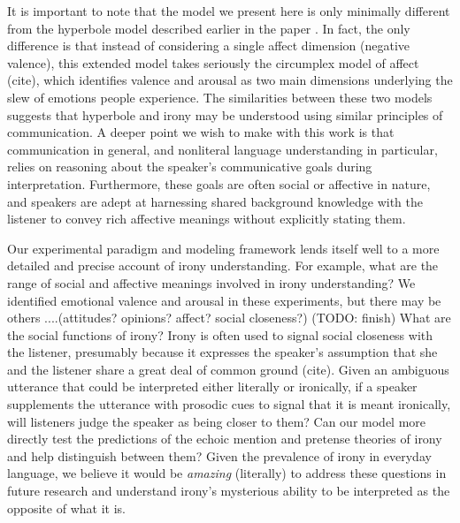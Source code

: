 \documentclass[10pt,letterpaper]{article}
\begin{document}

It is important to note that the model we present here is only minimally different from the hyperbole model described earlier in the paper \cite{kao2014nonliteral}. In fact, the only difference is that instead of considering a single affect dimension (negative valence), this extended model takes seriously the circumplex model of affect (cite), which identifies valence and arousal as two main dimensions underlying the slew of emotions people experience. The similarities between these two models suggests that hyperbole and irony may be understood using similar principles of communication. A deeper point we wish to make with this work is that communication in general, and nonliteral language understanding in particular, relies on reasoning about the speaker's communicative goals during interpretation. Furthermore, these goals are often social or affective in nature, and speakers are adept at harnessing shared background knowledge with the listener to convey rich affective meanings without explicitly stating them. 

Our experimental paradigm and modeling framework lends itself well to a more detailed and precise account of irony understanding. For example, what are the range of social and affective meanings involved in irony understanding? We identified emotional valence and arousal in these experiments, but there may be others ....(attitudes? opinions? affect? social closeness?)
(TODO: finish) What are the social functions of irony? Irony is often used to signal social closeness with the listener, presumably because it expresses the speaker's assumption that she and the listener share a great deal of common ground (cite). Given an ambiguous utterance that could be interpreted either literally or ironically, if a speaker supplements the utterance with prosodic cues to signal that it is meant ironically, will listeners judge the speaker as being closer to them? Can our model more directly  test the predictions of the echoic mention and pretense theories of irony and help distinguish between them? Given the prevalence of irony in everyday language, we believe it would be \emph{amazing} (literally) to address these questions in future research and understand irony's mysterious ability to be interpreted as the opposite of what it is.



\setlength{\bibleftmargin}{.125in}
\setlength{\bibindent}{-\bibleftmargin}


\end{document}

